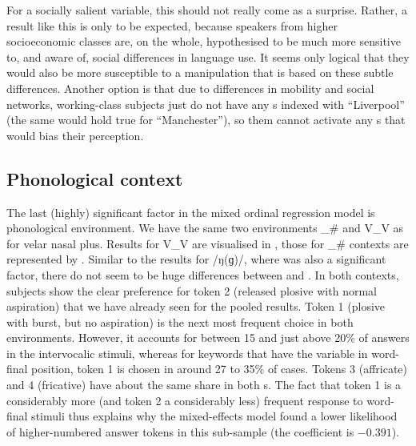 For a socially salient variable, this should not really come as a surprise.
Rather, a result like this is only to be expected, because speakers from higher socioeconomic classes are, on the whole, hypothesised to be much more sensitive to, and aware of, social differences in language use.
It seems only logical that they would also be more susceptible to a manipulation that is based on these subtle differences.
Another option is that due to differences in mobility and social networks, working-class subjects just do not have any s indexed with ``Liverpool'' (the same would hold true for ``Manchester''), so  them cannot activate any s that would bias their perception.

\subsection{Phonological context}
\label{sec.perc_res.k.phon}
The last (highly) significant factor in the mixed ordinal regression model is phonological environment.
We have the same two environments \_\# and V\_V as for velar nasal plus.
Results for V\_V are visualised in , those for \_\# contexts are represented by .
Similar to the results for /ŋ(ɡ)/, where  was also a significant factor, there do not seem to be huge differences between  and .
In both contexts, subjects show the clear preference for token 2 (released plosive with normal aspiration) that we have already seen for the pooled results.
Token 1 (plosive with burst, but no aspiration) is the next most frequent choice in both environments.
However, it accounts for between 15 and just above 20\% of answers in the intervocalic stimuli, whereas for keywords that have the variable in word-final position, token 1 is chosen in around 27 to 35\% of cases.
Tokens 3 (affricate) and 4 (fricative) have about the same share in both s.
The fact that token 1 is a considerably more (and token 2 a considerably less) frequent response to word-final stimuli thus explains why the mixed-effects model found a lower likelihood of higher-numbered answer tokens in this sub-sample (the coefficient is \ensuremath{-0.391}).

